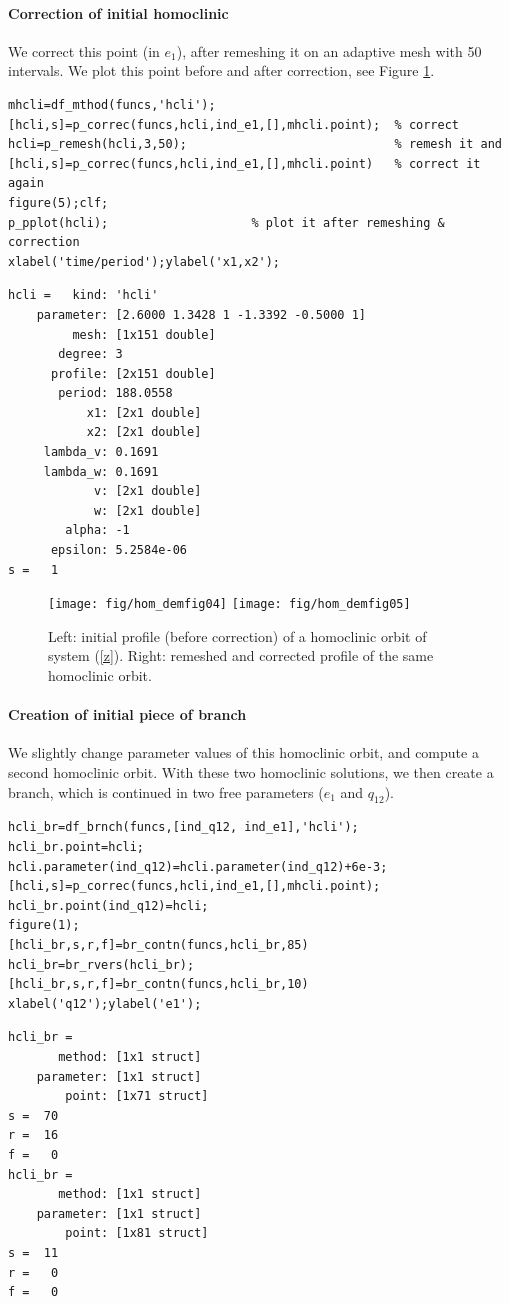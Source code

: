 \documentclass[10pt]{scrartcl}
\begin{document}
{\paragraph{Correction of initial homoclinic}
We correct this point (in $e_1$), after remeshing it on an adaptive
mesh with 50 intervals.  We plot this point before and after
correction, see Figure \ref{demo3-4+5}.
\begin{lstlisting}
mhcli=df_mthod(funcs,'hcli');
[hcli,s]=p_correc(funcs,hcli,ind_e1,[],mhcli.point);  % correct
hcli=p_remesh(hcli,3,50);                             % remesh it and
[hcli,s]=p_correc(funcs,hcli,ind_e1,[],mhcli.point)   % correct it again
figure(5);clf;
p_pplot(hcli);                    % plot it after remeshing & correction
xlabel('time/period');ylabel('x1,x2');  
\end{lstlisting}
{\small
\begin{verbatim}
hcli =   kind: 'hcli'
    parameter: [2.6000 1.3428 1 -1.3392 -0.5000 1]
         mesh: [1x151 double]
       degree: 3
      profile: [2x151 double]
       period: 188.0558
           x1: [2x1 double]
           x2: [2x1 double]
     lambda_v: 0.1691
     lambda_w: 0.1691
            v: [2x1 double]
            w: [2x1 double]
        alpha: -1
      epsilon: 5.2584e-06
s =   1
\end{verbatim}
}
\begin{figure}[ht]
\begin{center}
\texttt{[image: fig/hom\_demfig04]}
\texttt{[image: fig/hom\_demfig05]}
\caption{ Left: initial profile (before correction) of a homoclinic orbit of 
system (\ref{z}). Right: remeshed and corrected profile of the same homoclinic 
orbit. \label{demo3-4+5}} 
\end{center}
\end{figure}
\paragraph{Creation of initial piece of branch}
We slightly change parameter values of this homoclinic orbit, and
compute a second homoclinic orbit.  With these two homoclinic
solutions, we then create a branch, which is continued in two free
parameters ($e_1$ and $q_{12}$).
\begin{lstlisting}
hcli_br=df_brnch(funcs,[ind_q12, ind_e1],'hcli');
hcli_br.point=hcli;
hcli.parameter(ind_q12)=hcli.parameter(ind_q12)+6e-3;
[hcli,s]=p_correc(funcs,hcli,ind_e1,[],mhcli.point);
hcli_br.point(ind_q12)=hcli;
figure(1);
[hcli_br,s,r,f]=br_contn(funcs,hcli_br,85)
hcli_br=br_rvers(hcli_br);
[hcli_br,s,r,f]=br_contn(funcs,hcli_br,10)
xlabel('q12');ylabel('e1');  
\end{lstlisting}
{\small
\begin{verbatim}
hcli_br = 
       method: [1x1 struct]
    parameter: [1x1 struct]
        point: [1x71 struct]
s =  70
r =  16
f =   0
hcli_br = 
       method: [1x1 struct]
    parameter: [1x1 struct]
        point: [1x81 struct]
s =  11
r =   0
f =   0
\end{verbatim}
}
}
\end{document}
